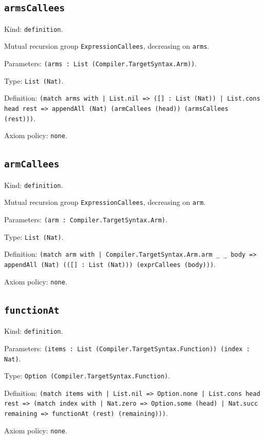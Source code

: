 \documentclass[11pt]{article}
\begin{document}
\subsection*{\texttt{armsCallees}}
\noindent Kind: \texttt{definition}.\par
\noindent Mutual recursion group \texttt{ExpressionCallees}, decreasing on \texttt{arms}.\par
\noindent Parameters: \texttt{(arms : List (Compiler.TargetSyntax.Arm))}.\par
\noindent Type: \texttt{List (Nat)}.\par
\noindent Definition: \texttt{(match arms with | List.nil => ([] : List (Nat)) | List.cons head rest => appendAll (Nat) (armCallees (head)) (armsCallees (rest)))}.\par
\noindent Axiom policy: \texttt{none}.\par
\subsection*{\texttt{armCallees}}
\noindent Kind: \texttt{definition}.\par
\noindent Mutual recursion group \texttt{ExpressionCallees}, decreasing on \texttt{arm}.\par
\noindent Parameters: \texttt{(arm : Compiler.TargetSyntax.Arm)}.\par
\noindent Type: \texttt{List (Nat)}.\par
\noindent Definition: \texttt{(match arm with | Compiler.TargetSyntax.Arm.arm \_ \_ body => appendAll (Nat) (([] : List (Nat))) (exprCallees (body)))}.\par
\noindent Axiom policy: \texttt{none}.\par
\subsection*{\texttt{functionAt}}
\noindent Kind: \texttt{definition}.\par
\noindent Parameters: \texttt{(items : List (Compiler.TargetSyntax.Function)) (index : Nat)}.\par
\noindent Type: \texttt{Option (Compiler.TargetSyntax.Function)}.\par
\noindent Definition: \texttt{(match items with | List.nil => Option.none | List.cons head rest => (match index with | Nat.zero => Option.some (head) | Nat.succ remaining => functionAt (rest) (remaining)))}.\par
\noindent Axiom policy: \texttt{none}.\par
\end{document}
